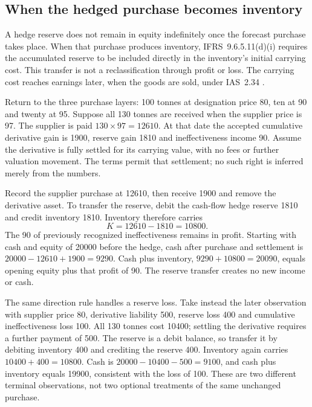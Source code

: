 \subsection{When the hedged purchase becomes inventory}
\label{sec:rebalanced-hedge-inventory}

A hedge reserve does not remain in equity indefinitely once the forecast
purchase takes place. When that purchase produces inventory, IFRS~9.6.5.11(d)(i)
requires the accumulated reserve to be included directly in the inventory's
initial carrying cost. This transfer is not a reclassification through profit
or loss. The carrying cost reaches earnings later, when the goods are sold,
under IAS~2.34 \citep[IFRS~9, paragraph 6.5.11(d)(i); IAS~2, paragraphs
10--11 and 34]{eu20231803}.

Return to the three purchase layers: 100 tonnes at designation price 80,
ten at 90 and twenty at 95. Suppose all 130 tonnes are received when the
supplier price is 97. The supplier is paid $130\times97=12610$. At that
date the accepted cumulative derivative gain is 1900, reserve gain 1810
and ineffectiveness income 90. Assume the derivative is fully settled for
its carrying value, with no fees or further valuation movement. The terms
permit that settlement; no such right is inferred merely from the numbers.

Record the supplier purchase at 12610, then receive 1900 and remove the
derivative asset. To transfer the reserve, debit the cash-flow hedge reserve
1810 and credit inventory 1810. Inventory therefore carries
\[
 K=12610-1810=10800.
\]
The 90 of previously recognized ineffectiveness remains in profit. Starting
with cash and equity of 20000 before the hedge, cash after purchase and
settlement is $20000-12610+1900=9290$. Cash plus inventory,
$9290+10800=20090$, equals opening equity plus that profit of 90. The
reserve transfer creates no new income or cash.

The same direction rule handles a reserve loss. Take instead the later
observation with supplier price 80, derivative liability 500, reserve loss
400 and cumulative ineffectiveness loss 100. All 130 tonnes cost 10400;
settling the derivative requires a further payment of 500. The reserve is
a debit balance, so transfer it by debiting inventory 400 and crediting
the reserve 400. Inventory again carries $10400+400=10800$. Cash is
$20000-10400-500=9100$, and cash plus inventory equals 19900, consistent
with the loss of 100. These are two different terminal observations, not
two optional treatments of the same unchanged purchase.

